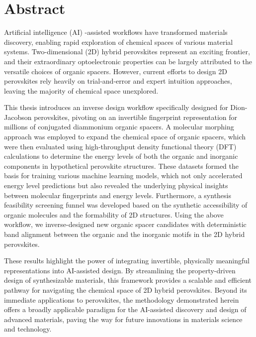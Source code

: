 \chapter{Abstract}

Artificial intelligence (AI) -assisted workflows have transformed materials discovery, enabling rapid exploration of chemical spaces of various material systems. Two-dimensional (2D) hybrid perovskites represent an exciting frontier, and their extraordinary optoelectronic properties can be largely attributed to the versatile choices of organic spacers. However, current efforts to design 2D perovskites rely heavily on trial-and-error and expert intuition approaches, leaving the majority of chemical space unexplored. 

This thesis introduces an inverse design workflow specifically designed for Dion-Jacobson perovskites, pivoting on an invertible fingerprint representation for millions of conjugated diammonium organic spacers. A molecular morphing approach was employed to expand the chemical space of organic spacers, which were then evaluated using high-throughput density functional theory (DFT) calculations to determine the energy levels of both the organic and inorganic components in hypothetical perovskite structures. These datasets formed the basis for training various machine learning models, which not only accelerated energy level predictions but also revealed the underlying physical insights between molecular fingerprints and energy levels. Furthermore, a synthesis feasibility screening funnel was developed based on the synthetic accessibility of organic molecules and the formability of 2D structures. Using the above workflow, we inverse-designed new organic spacer candidates with deterministic band alignment between the organic and the inorganic motifs in the 2D hybrid perovskites. 

These results highlight the power of integrating invertible, physically meaningful representations into AI-assisted design. By streamlining the property-driven design of synthesizable materials, this framework provides a scalable and efficient pathway for navigating the chemical space of 2D hybrid perovskites. Beyond its immediate applications to perovskites, the methodology demonstrated herein offers a broadly applicable paradigm for the AI-assisted discovery and design of advanced materials, paving the way for future innovations in materials science and technology.
